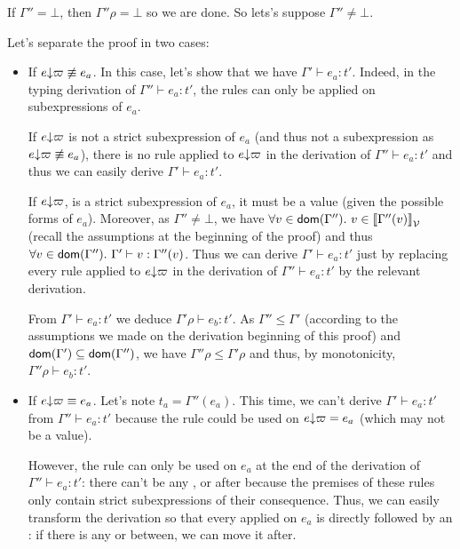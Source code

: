 \documentclass[a4paper]{article}
\theoremstyle{definition}
\begin{document}
\begin{description}
          If $\Gamma'' = \bot$, then $\Gamma''\rho = \bot$ so we are done. So lets's suppose $\Gamma'' \neq \bot$.

          Let's separate the proof in two cases:
          \begin{itemize}
            \item If $e{\downarrow}\varpi \not\equiv e_a$. In this case, let's show that we have  $\Gamma'\vdash e_a:t'$.
            Indeed, in the typing derivation of $\Gamma''\vdash e_a:t'$, the  rules can only be applied on
            subexpressions of $e_a$.
            
            If $e{\downarrow}\varpi$ is not a strict subexpression of $e_a$
            (and thus not a subexpression as $e{\downarrow}\varpi \not\equiv e_a$), there is no  rule applied to $e{\downarrow}\varpi$
            in the derivation of $\Gamma''\vdash e_a:t'$ and thus we can easily derive $\Gamma'\vdash e_a:t'$.

            If $e{\downarrow}\varpi$, is a strict subexpression of $e_a$, it must be a value (given the possible forms of $e_a$).
            Moreover, as $\Gamma'' \neq \bot$, we have $\forall v\in\dom{\Gamma''}.\ v\in\valsemantic{\Gamma''(v)}$ (recall the assumptions at the beginning of the proof)
            and thus $\forall v\in\textsf{dom}(\Gamma'').\ \Gamma'\vdash v : \Gamma''(v)$.
            Thus we can derive $\Gamma'\vdash e_a:t'$ just by replacing every  rule applied to $e{\downarrow}\varpi$ in the derivation of $\Gamma''\vdash e_a:t'$
            by the relevant derivation.

            From $\Gamma'\vdash e_a:t'$ we deduce $\Gamma'\rho\vdash e_b:t'$.
            As $\Gamma''\leq\Gamma'$ (according to the assumptions we made on the derivation beginning of this proof)
            and $\textsf{dom}(\Gamma')\subseteq\textsf{dom}(\Gamma'')$, we have $\Gamma''\rho\leq\Gamma'\rho$ and thus, by monotonicity,
            $\Gamma''\rho\vdash e_b:t'$.

            \item            
            If $e{\downarrow}\varpi \equiv e_a$. Let's note $t_a=\Gamma''(e_a)$. This time,
            we can't derive $\Gamma'\vdash e_a:t'$ from $\Gamma''\vdash e_a:t'$ because the rule 
            could be used on $e{\downarrow}\varpi=e_a$ (which may not be a value).

            However, the rule  can only be used on $e_a$ at the end of the derivation of $\Gamma''\vdash e_a:t'$:
            there can't be any ,  or  after because the premises of these rules only contain strict subexpressions of their
            consequence.
            Thus, we can easily transform the derivation so that every  applied on $e_a$ is directly followed by an :
            if there is any  or  between, we can move it after.


\end{itemize}
\end{description}
\end{document}
